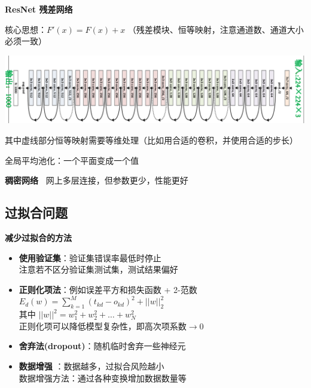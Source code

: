 \documentclass[b4paper, 10pt]{ctexart}
\makeatletter
\newenvironment{figurehere}
{\def\@captype{figure}}
{}
\makeatother
\begin{document}
\begin{multicols}{3}
\textbf{ResNet 残差网络\ }  

核心思想：$F'(x) = F(x) + x$ （残差模块、恒等映射，注意通道数、通道大小必须一致）

\begin{figurehere}
    \centering    \includegraphics[width=0.95\linewidth]{figs/ResNet.png}
    \label{fig:ResNet}
\end{figurehere}

其中虚线部分恒等映射需要等维处理（比如用合适的卷积，并使用合适的步长）

全局平均池化：一个平面变成一个值

\textbf{稠密网络\ } 网上多层连接，但参数更少，性能更好

\subsection{过拟合问题}
\textbf{减少过拟合的方法\ }
\begin{itemize}
    \item \textbf{使用验证集}：验证集错误率最低时停止\\
    注意若不区分验证集测试集，测试结果偏好
    \item \textbf{正则化项法}：例如误差平方和损失函数 + 2-范数
    $E_d(w) = \sum_{k=1}^M(t_{kd}-o_{kd})^2 + ||w||^2_2$\\ 其中 $||w||^2 = w_1^2+w_2^2+ \dots + w_N^2$\\
    \small{正则化项可以降低模型复杂性，即高次项系数$\to 0$}
    \item \textbf{舍弃法(dropout)}：随机临时舍弃一些神经元
    \item \textbf{数据增强 }：数据越多，过拟合风险越小\\ 数据增强方法：通过各种变换增加数据数量等
\end{itemize}





\end{multicols}
\end{document}
